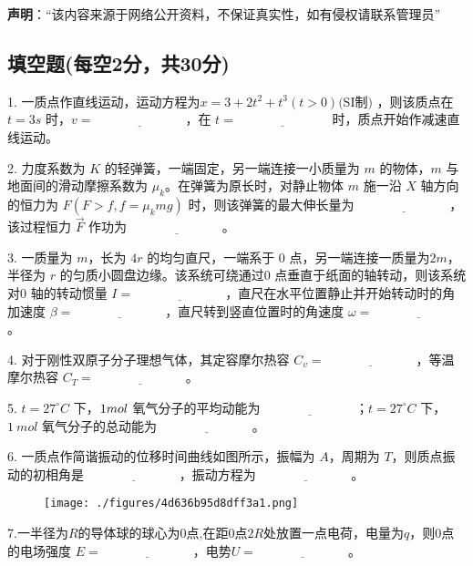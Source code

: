 
\textbf{声明}：“该内容来源于网络公开资料，不保证真实性，如有侵权请联系管理员”

\subsection{填空题(每空2分，共30分)}

1. 一质点作直线运动，运动方程为$x=3+2t^2+t^3(t>0)\text{(SI制)}$ ，则该质点在$t = 3s$ 时，$v = \underline{\hspace{3cm}}$，在 $t = \underline{\hspace{3cm}}$ 时，质点开始作减速直线运动。

2. 力度系数为 $K$ 的轻弹簧，一端固定，另一端连接一小质量为 $m$ 的物体，$m$ 与地面间的滑动摩擦系数为 $\mu_k$。在弹簧为原长时，对静止物体 $m$ 施一沿 $X$ 轴方向的恒力为 $F (F > f, f = \mu_k mg)$ 时，则该弹簧的最大伸长量为 $\underline{\hspace{3cm}}$，该过程恒力 $\vec{F}$ 作功为 $\underline{\hspace{3cm}}$。

3. 一质量为 $m$，长为 $4r$ 的均匀直尺，一端系于 0 点，另一端连接一质量为$2m$，半径为 $r$ 的匀质小圆盘边缘。该系统可绕通过0 点垂直于纸面的轴转动，则该系统对0 轴的转动惯量 $I = \underline{\hspace{3cm}}$，直尺在水平位置静止并开始转动时的角加速度 $\beta = \underline{\hspace{3cm}}$，直尺转到竖直位置时的角速度 $\omega = \underline{\hspace{3cm}}$。

4. 对于刚性双原子分子理想气体，其定容摩尔热容 $C_v =\underline{\hspace{3cm}}$，等温摩尔热容 $C_T = \underline{\hspace{3cm}}$。

5. $t = 27^\circ C$ 下，$1 \\ mol$ 氧气分子的平均动能为 $\underline{\hspace{3cm}}$；$t = 27^\circ C$ 下，$1 \ mol$ 氧气分子的总动能为 $\underline{\hspace{3cm}}$。

6. 一质点作简谐振动的位移时间曲线如图所示，振幅为 $A$，周期为 $T$，则质点振动的初相角是 $\underline{\hspace{3cm}}$，振动方程为 $\underline{\hspace{3cm}}$。
\begin{figure}[ht]
\centering
\texttt{[image: ./figures/4d636b95d8dff3a1.png]}
\caption{} \label{fig_NJU08_1}
\end{figure}
7.一半径为$R$的导体球的球心为0点,在距0点$2R$处放置一点电荷，电量为$q$，则0点的电场强度 $E=\underline{\hspace{3cm}}$，电势$U=\underline{\hspace{3cm}}$。
